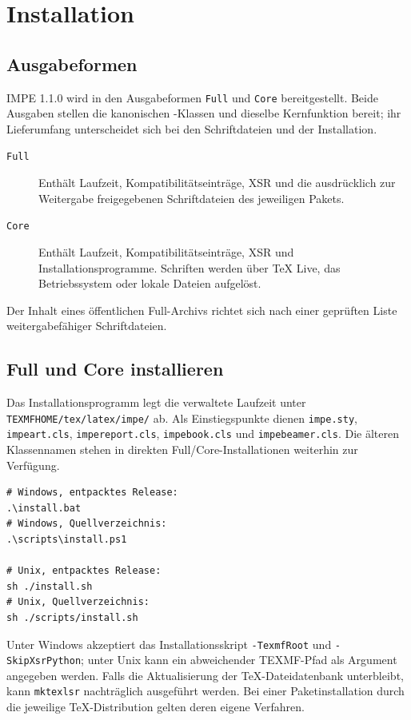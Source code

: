 \documentclass[11pt]{impeart}
\begin{document}
\section{Installation}

\subsection{Ausgabeformen}

IMPE 1.1.0 wird in den Ausgabeformen \texttt{Full} und \texttt{Core}
bereitgestellt. Beide Ausgaben stellen die
kanonischen \XeLaTeX{}-Klassen und dieselbe Kernfunktion bereit;
ihr Lieferumfang unterscheidet sich bei den Schriftdateien und
der Installation.

\begin{description}
  \item[\texttt{Full}] Enthält Laufzeit, Kompatibilitätseinträge,
    XSR und die ausdrücklich zur Weitergabe freigegebenen
    Schriftdateien des jeweiligen Pakets.
  \item[\texttt{Core}] Enthält Laufzeit, Kompatibilitätseinträge,
    XSR und Installationsprogramme. Schriften werden über
    \TeX{} Live, das Betriebssystem oder lokale Dateien aufgelöst.
\end{description}

Der Inhalt eines öffentlichen Full-Archivs richtet sich nach
einer geprüften Liste weitergabefähiger Schriftdateien.

\subsection{Full und Core installieren}

Das Installationsprogramm legt die verwaltete Laufzeit unter
\texttt{TEXMFHOME/tex/latex/impe/} ab. Als Einstiegspunkte
dienen \texttt{impe.sty}, \texttt{impeart.cls},
\texttt{impereport.cls}, \texttt{impebook.cls} und
\texttt{impebeamer.cls}. Die älteren Klassennamen stehen
in direkten Full/Core-Installationen weiterhin zur Verfügung.

\begin{verbatim}
# Windows, entpacktes Release:
.\install.bat
# Windows, Quellverzeichnis:
.\scripts\install.ps1

# Unix, entpacktes Release:
sh ./install.sh
# Unix, Quellverzeichnis:
sh ./scripts/install.sh
\end{verbatim}

Unter Windows akzeptiert das Installationsskript
\texttt{-TexmfRoot} und \texttt{-SkipXsrPython}; unter
Unix kann ein abweichender TEXMF-Pfad als Argument angegeben
werden. Falls die Aktualisierung der \TeX{}-Dateidatenbank
unterbleibt, kann \texttt{mktexlsr} nachträglich ausgeführt
werden. Bei einer Paketinstallation durch die jeweilige
\TeX{}-Distribution gelten deren eigene Verfahren.
\end{document}
